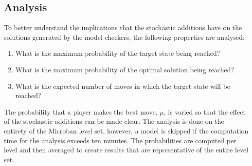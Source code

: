 \subsection{Analysis}
\label{sec:analysis}
To better understand the implications that the stochastic additions have on the solutions generated by the model checkers, the following properties are analysed:
\begin{enumerate}
    \item What is the maximum probability of the target state being reached?
    \item What is the maximum probability of the optimal solution being reached?
    \item What is the expected number of moves in which the target state will be reached?
\end{enumerate}

The probability that a player makes the best move, $\mu$, is varied so that the effect of the stochastic additions can be made clear. The analysis is done on the entirety of the Microban level set, however, a model is skipped if the computation time for the analysis exceeds ten minutes. The probabilities are computed per level and then averaged to create results that are representative of the entire level set.